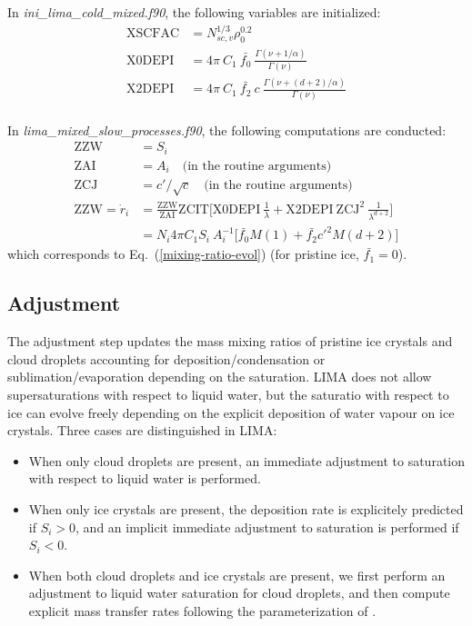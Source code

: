 In \emph{ini\_lima\_cold\_mixed.f90}, the following variables are initialized:
\begin{align}
 \mathrm{XSCFAC} &= N_{sc,v}^{1/3} \rho_0^{0.2} \\
 \mathrm{X0DEPI} &= 4 \pi ~ C_1 ~ \bar{f_0} ~ \frac{\Gamma(\nu+1/\alpha)}{\Gamma(\nu)} \\
 \mathrm{X2DEPI} &= 4 \pi ~ C_1 ~ \bar{f_2} ~ c ~ \frac{\Gamma(\nu+(d+2)/\alpha)}{\Gamma(\nu)} \\
\end{align}

In \emph{lima\_mixed\_slow\_processes.f90}, the following computations are conducted:
\begin{align}
 \mathrm{ZZW} &= S_i \\
 \mathrm{ZAI} &= A_i \quad \text{(in the routine arguments)} \\
 \mathrm{ZCJ} &= c'/\sqrt{c} \quad \text{(in the routine arguments)} \\
 \mathrm{ZZW} = \dot{r}_i &= \frac{\mathrm{ZZW}}{\mathrm{ZAI}} \mathrm{ZCIT} \bigg[\mathrm{X0DEPI} ~ \frac{1}{\lambda} + \mathrm{X2DEPI} ~ \mathrm{ZCJ}^2 ~ \frac{1}{\lambda^{d+2}}\bigg]  \\
 &= N_i 4 \pi C_1 S_i~A_i^{-1} \bigg[ \bar{f_0} M(1) + \bar{f_2} c'^2 M(d+2) \bigg]
 \end{align}
which corresponds to Eq.\ (\ref{mixing-ratio-evol}) (for pristine ice, $\bar{f_1}=0$).

\subsection{Adjustment}

The adjustment step updates the mass mixing ratios of pristine ice crystals and cloud droplets accounting for deposition/condensation or sublimation/evaporation depending on the saturation. LIMA does not allow supersaturations with respect to liquid water, but the saturatio with respect to ice can evolve freely depending on the explicit deposition of water vapour on ice crystals. Three cases are distinguished in LIMA:
\begin{itemize}
 \item When only cloud droplets are present, an immediate adjustment to saturation with respect to liquid water is performed. 
 \item When only ice crystals are present, the deposition rate is explicitely predicted if $S_i>0$, and an implicit immediate adjustment to saturation is performed if $S_i<0$.
 \item When both cloud droplets and ice crystals are present, we first perform an adjustment to liquid water saturation for cloud droplets, and then compute explicit mass transfer rates following the parameterization of \citet[][Section 2b4 and appendix B]{Reisin1996}.
\end{itemize}

